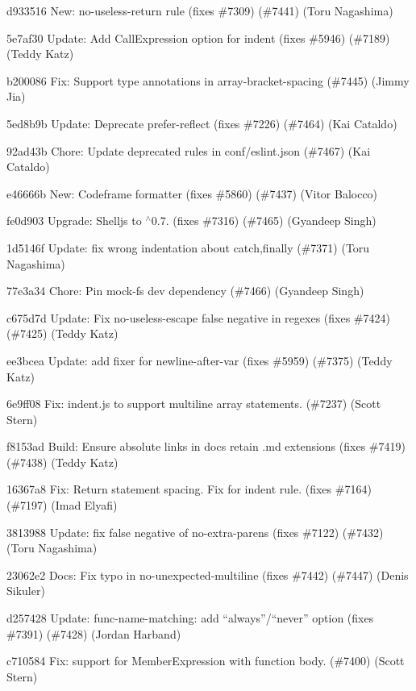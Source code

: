 \begin{DoxyItemize}
\item d933516 New\+: {\ttfamily no-\/useless-\/return} rule (fixes \#7309) (\#7441) (Toru Nagashima)
\item 5e7af30 Update\+: Add {\ttfamily Call\+Expression} option for {\ttfamily indent} (fixes \#5946) (\#7189) (Teddy Katz)
\item b200086 Fix\+: Support type annotations in array-\/bracket-\/spacing (\#7445) (Jimmy Jia)
\item 5ed8b9b Update\+: Deprecate prefer-\/reflect (fixes \#7226) (\#7464) (Kai Cataldo)
\item 92ad43b Chore\+: Update deprecated rules in conf/eslint.\+json (\#7467) (Kai Cataldo)
\item e46666b New\+: Codeframe formatter (fixes \#5860) (\#7437) (Vitor Balocco)
\item fe0d903 Upgrade\+: Shelljs to $^\wedge$0.7. (fixes \#7316) (\#7465) (Gyandeep Singh)
\item 1d5146f Update\+: fix wrong indentation about {\ttfamily catch},{\ttfamily finally} (\#7371) (Toru Nagashima)
\item 77e3a34 Chore\+: Pin mock-\/fs dev dependency (\#7466) (Gyandeep Singh)
\item c675d7d Update\+: Fix {\ttfamily no-\/useless-\/escape} false negative in regexes (fixes \#7424) (\#7425) (Teddy Katz)
\item ee3bcea Update\+: add fixer for {\ttfamily newline-\/after-\/var} (fixes \#5959) (\#7375) (Teddy Katz)
\item 6e9ff08 Fix\+: indent.\+js to support multiline array statements. (\#7237) (Scott Stern)
\item f8153ad Build\+: Ensure absolute links in docs retain .md extensions (fixes \#7419) (\#7438) (Teddy Katz)
\item 16367a8 Fix\+: Return statement spacing. Fix for indent rule. (fixes \#7164) (\#7197) (Imad Elyafi)
\item 3813988 Update\+: fix false negative of {\ttfamily no-\/extra-\/parens} (fixes \#7122) (\#7432) (Toru Nagashima)
\item 23062e2 Docs\+: Fix typo in no-\/unexpected-\/multiline (fixes \#7442) (\#7447) (Denis Sikuler)
\item d257428 Update\+: {\ttfamily func-\/name-\/matching}\+: add “always”/“never” option (fixes \#7391) (\#7428) (Jordan Harband)
\item c710584 Fix\+: support for Member\+Expression with function body. (\#7400) (Scott Stern)

\end{DoxyItemize}
